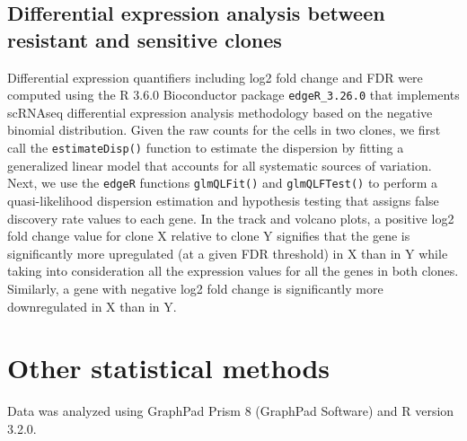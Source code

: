 \subsection{Differential expression analysis between resistant and sensitive clones}
Differential expression quantifiers including log2 fold change and FDR  were computed using the R 3.6.0 Bioconductor package \texttt{edgeR\_3.26.0} that implements scRNAseq differential expression analysis methodology based on the negative binomial distribution. Given the raw counts for the cells in two clones, we first call the \texttt{estimateDisp()} function to estimate the dispersion by fitting a generalized linear model that accounts for all systematic sources of variation. Next, we use the \texttt{edgeR} functions \texttt{glmQLFit()} and \texttt{glmQLFTest()} to perform a quasi-likelihood dispersion estimation and hypothesis testing that assigns false discovery rate values to each gene. In the track and volcano plots, a positive log2 fold change value for clone X relative to clone Y signifies that the gene is significantly more upregulated (at a given FDR threshold) in X than in Y while taking into consideration all the expression values for all the genes in both clones. Similarly, a gene with negative log2 fold change is significantly more downregulated in X than in Y. 

\section{Other statistical methods}
Data was analyzed using GraphPad Prism 8 (GraphPad Software) and R version 3.2.0.